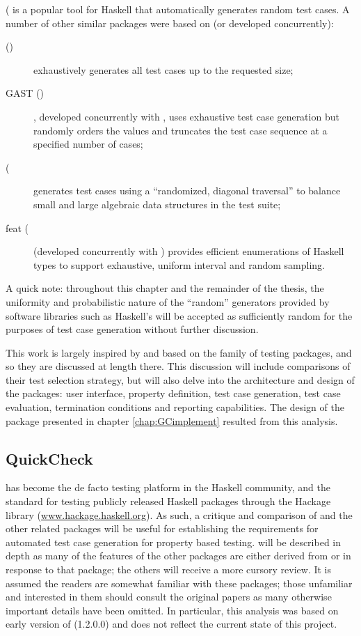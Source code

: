 \QC  (\citep{Claessen2000} is a popular \pbt tool for Haskell
that automatically generates random test cases.
A number of other similar packages were
based on \QC (or developed concurrently):

\begin{description}
\item[\SC (\citep{Runcimanetal2008}) ] exhaustively generates all test cases up to the requested size;
\item[GAST (\cite{GAST2002})],  developed concurrently with \QC,
uses exhaustive test case generation but randomly orders the values
and truncates the test case sequence at a specified number of cases;
\item[\EC (\cite{EasyCheck2008}] generates test cases using a
``randomized, diagonal traversal'' to balance small and large algebraic data structures in the test suite;
\item[feat (\cite {Duregard2012}] (developed concurrently with \GC) 
provides efficient enumerations of Haskell types to support exhaustive, uniform interval and random sampling.
\end{description}

A quick note: throughout this chapter and the remainder of the thesis,
the uniformity and probabilistic nature of the ``random'' generators 
provided by software libraries such as Haskell's will be accepted
as sufficiently random for the purposes of test case generation
without further discussion.

This work is largely inspired by and based on the \QC family of testing packages,
and so they are discussed at length there.
This discussion will include comparisons of their test selection strategy,
but will also delve into the architecture and design of the packages:
user interface, property definition, test case generation, test case evaluation, termination conditions and reporting capabilities.
The design of the \GC package presented in chapter \ref{chap:GCimplement} 
resulted from this analysis.

\subsection{QuickCheck}\label{sub:quickcheck}

\QC has become the de facto testing platform in the Haskell community,
and the standard for testing publicly released Haskell packages 
through the Hackage library (\url{www.hackage.haskell.org}).
As such, a critique and comparison of \QC and the other related packages
will be useful for establishing the requirements for 
automated test case generation for property based testing.
\QC will be described in depth
as many of the features of the other packages are either 
derived from or in response to that package;
the others will receive a more cursory review.
It is assumed the readers are somewhat familiar with these packages;
those unfamiliar and interested in them should consult the original papers 
as many otherwise important details have been omitted.
In particular, this analysis was based on early version of \QC (1.2.0.0) and
does not reflect the current state of this project.

